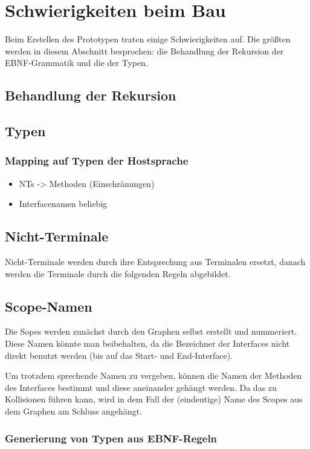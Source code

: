 \documentclass[../InterneDSLs.tex]{subfiles}
\begin{document}
\section{Schwierigkeiten beim Bau}
Beim Erstellen des Prototypen traten einige Schwierigkeiten auf. Die größten werden in diesem Abschnitt besprochen: die Behandlung der Rekursion der EBNF-Grammatik und die der Typen.

\subsection{Behandlung der Rekursion}

\subsection{Typen}

\subsubsection{Mapping auf Typen der Hostsprache}
\begin{itemize}
	\item NTs -> Methoden (Einschränungen)
	\item Interfacenamen beliebig
\end{itemize}

\subsection{Nicht-Terminale}
Nicht-Terminale werden durch ihre Entsprechung aus Terminalen ersetzt, danach werden die Terminale durch die folgenden Regeln abgebildet.

\subsection{Scope-Namen}
Die Sopes werden zunächst durch den Graphen selbst erstellt und nummeriert. Diese Namen könnte man beibehalten, da die Bezeichner der Interfaces nicht direkt benutzt werden (bis auf das Start- und End-Interface).

Um trotzdem sprechende Namen zu vergeben, können die Namen der Methoden des Interfaces bestimmt und diese aneinander gehängt werden. Da das zu Kollisionen führen kann, wird in dem Fall der (eindeutige) Name des Scopes aus dem Graphen am Schluss angehängt.

\subsubsection{Generierung von Typen aus EBNF-Regeln}
\end{document}
